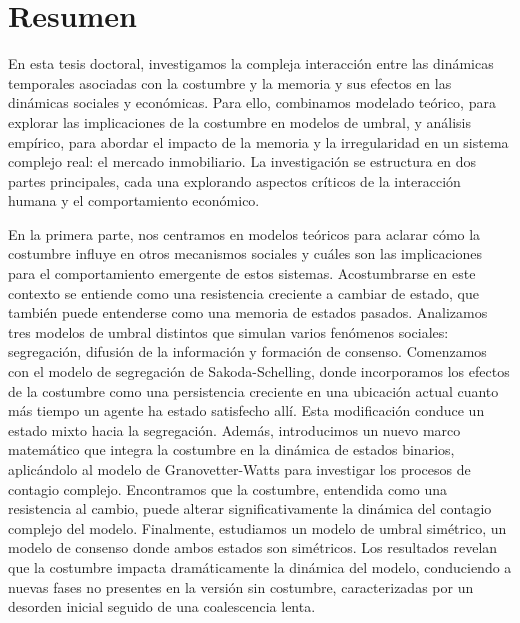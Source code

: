 \pagebreak
\thispagestyle{empty}
\section*{Resumen}

En esta tesis doctoral, investigamos la compleja interacción entre las dinámicas temporales asociadas con la costumbre y la memoria y sus efectos en las dinámicas sociales y económicas. Para ello, combinamos modelado teórico, para explorar las implicaciones de la costumbre en modelos de umbral, y análisis empírico, para abordar el impacto de la memoria y la irregularidad en un sistema complejo real: el mercado inmobiliario. La investigación se estructura en dos partes principales, cada una explorando aspectos críticos de la interacción humana y el comportamiento económico.

En la primera parte, nos centramos en modelos teóricos para aclarar cómo la costumbre influye en otros mecanismos sociales y cuáles son las implicaciones para el comportamiento emergente de estos sistemas. Acostumbrarse en este contexto se entiende como una resistencia creciente a cambiar de estado, que también puede entenderse como una memoria de estados pasados. Analizamos tres modelos de umbral distintos que simulan varios fenómenos sociales: segregación, difusión de la información y formación de consenso. Comenzamos con el modelo de segregación de Sakoda-Schelling, donde incorporamos los efectos de la costumbre como una persistencia creciente en una ubicación actual cuanto más tiempo un agente ha estado satisfecho allí. Esta modificación conduce un estado mixto hacia la segregación. Además, introducimos un nuevo marco matemático que integra la costumbre en la dinámica de estados binarios, aplicándolo al modelo de Granovetter-Watts para investigar los procesos de contagio complejo. Encontramos que la costumbre, entendida como una resistencia al cambio, puede alterar significativamente la dinámica del contagio complejo del modelo. Finalmente, estudiamos un modelo de umbral simétrico, un modelo de consenso donde ambos estados son simétricos. Los resultados revelan que la costumbre impacta dramáticamente la dinámica del modelo, conduciendo a nuevas fases no presentes en la versión sin costumbre, caracterizadas por un desorden inicial seguido de una coalescencia lenta.

